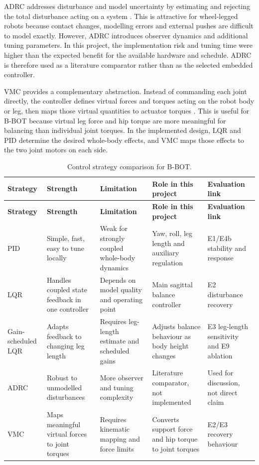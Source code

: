 \documentclass[12pt, a4paper]{article}
\begin{document}
ADRC addresses disturbance and model uncertainty by estimating and rejecting the total disturbance acting on a system \cite{han2009adrc}. This is attractive for wheel-legged robots because contact changes, modelling errors and external pushes are difficult to model exactly. However, ADRC introduces observer dynamics and additional tuning parameters. In this project, the implementation risk and tuning time were higher than the expected benefit for the available hardware and schedule. ADRC is therefore used as a literature comparator rather than as the selected embedded controller.

VMC provides a complementary abstraction. Instead of commanding each joint directly, the controller defines virtual forces and torques acting on the robot body or leg, then maps those virtual quantities to actuator torques \cite{pratt2001vmc}. This is useful for B-BOT because virtual leg force and hip torque are more meaningful for balancing than individual joint torques. In the implemented design, LQR and PID determine the desired whole-body effects, and VMC maps those effects to the two joint motors on each side.


\begingroup
\singlespacing
\scriptsize
\setlength{\tabcolsep}{2pt}
\renewcommand{\arraystretch}{1.15}
\begin{longtable}{>{\RaggedRight\arraybackslash}p{}>{\RaggedRight\arraybackslash}p{}>{\RaggedRight\arraybackslash}p{}>{\RaggedRight\arraybackslash}p{}>{\RaggedRight\arraybackslash}p{}}
\caption{Control strategy comparison for B-BOT.}\\
\toprule
\textbf{Strategy} & \textbf{Strength} & \textbf{Limitation} & \textbf{Role in this project} & \textbf{Evaluation link} \\
\midrule
\endfirsthead
\toprule
\textbf{Strategy} & \textbf{Strength} & \textbf{Limitation} & \textbf{Role in this project} & \textbf{Evaluation link} \\
\midrule
\endhead
PID & Simple, fast, easy to tune locally & Weak for strongly coupled whole-body dynamics & Yaw, roll, leg length and auxiliary regulation & E1/E4b stability and response \\
LQR & Handles coupled state feedback in one controller & Depends on model quality and operating point & Main sagittal balance controller & E2 disturbance recovery \\
Gain-scheduled LQR & Adapts feedback to changing leg length & Requires leg-length estimate and scheduled gains & Adjusts balance behaviour as body height changes & E3 leg-length sensitivity and E9 ablation \\
ADRC & Robust to unmodelled disturbances & More observer and tuning complexity & Literature comparator, not implemented & Used for discussion, not direct claim \\
VMC & Maps meaningful virtual forces to joint torques & Requires kinematic mapping and force limits & Converts support force and hip torque to joint torques & E2/E3 recovery behaviour \\
\bottomrule
\end{longtable}
\endgroup
\end{document}
